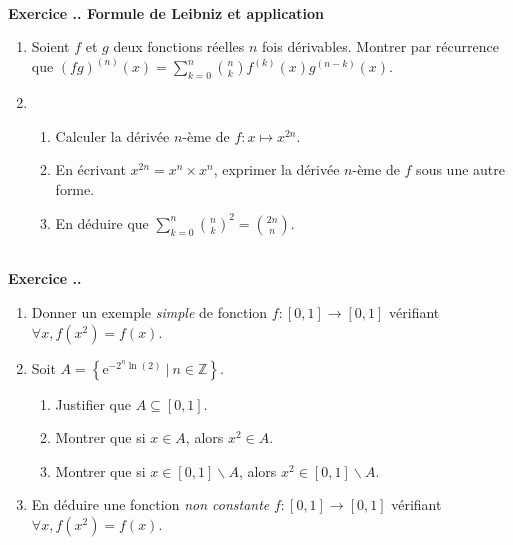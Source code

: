 \documentclass{article}
\newcommand{\mb}[1]{\mathbb{#1}}
\newcounter{exo}
\newcommand{\exercice}[1][\null]{\textbf{\\ \large Exercice \thesection.\theexo. \normalsize #1} \addtocounter{exo}{1}}
\begin{document}
\exercice[Formule de Leibniz et application]

\begin{enumerate}

\item Soient $f$ et $g$ deux fonctions réelles $n$ fois dérivables. Montrer par récurrence que $\displaystyle (fg)^{(n)} (x)= \sum_{k=0}^n {n \choose k} f^{(k)}(x) g^{(n-k)}(x)$.

\item \begin{enumerate}

\item Calculer la dérivée $n$-ème de $f:x \mapsto x^{2n}$.

\item En écrivant $x^{2n} = x^n\times x^n$, exprimer la dérivée $n$-ème de $f$ sous une autre forme.

\item En déduire que $\displaystyle \sum_{k=0}^n {n \choose k}^2 = {2n \choose n}$.

\end{enumerate}

\end{enumerate}

\exercice 

\begin{enumerate}

\item Donner un exemple \emph{simple} de fonction $f:[0,1] \rightarrow [0,1]$ vérifiant $\forall x, f(x^2) = f(x)$.
\item Soit $\displaystyle A = \left\{\text{e}^{-2^n\ln(2)}~\Big|~n \in \mb{Z}\right\}$.

\begin{enumerate}

\item Justifier que $A \subseteq[0,1]$.

\item Montrer que si $x \in A$, alors $x^2 \in A$.

\item Montrer que si $x \in [0,1]\smallsetminus A$, alors $x^2 \in [0,1]\smallsetminus A$.

\end{enumerate}

\item En déduire une fonction \emph{non constante} $f:[0,1] \rightarrow [0,1]$ vérifiant $\forall x, f(x^2) = f(x)$.
\end{enumerate}
\end{document}
